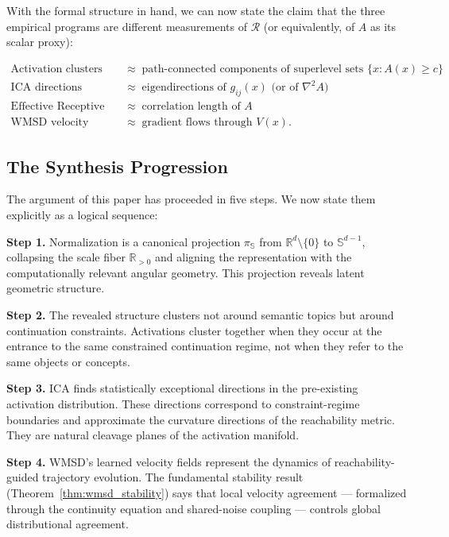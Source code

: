 \documentclass[12pt, a4paper]{article}
\theoremstyle{plain}
\theoremstyle{definition}
\theoremstyle{remark}
\newcommand{\R}{\mathbb{R}}
\newcommand{\Sph}{\mathbb{S}}
\newcommand{\fA}{A}
\begin{document}
With the formal structure in hand, we can now state the claim that the three
empirical programs are different measurements of $\mathcal{R}$ (or equivalently,
of $\fA$ as its scalar proxy):

\begin{equation}
\begin{aligned}
  \text{Activation clusters} &\;\approx\; \text{path-connected components of superlevel sets }
    \bigl\{x : \fA(x) \geq c\bigr\} \\
  \text{ICA directions} &\;\approx\; \text{eigendirections of } g_{ij}(x)
    \text{ (or of } \nabla^2 \fA\text{)} \\
  \text{Effective Receptive Field} &\;\approx\; \text{correlation length of } \fA \\
  \text{WMSD velocity fields} &\;\approx\; \text{gradient flows through } V(x).
\end{aligned}
\end{equation}

\subsection{The Synthesis Progression}

The argument of this paper has proceeded in five steps. We now state them
explicitly as a logical sequence:

\textbf{Step 1.} Normalization is a canonical projection $\pi_\Sph$ from
$\R^d \setminus \{0\}$ to $\Sph^{d-1}$, collapsing the scale fiber $\R_{>0}$
and aligning the representation with the computationally relevant angular
geometry. This projection reveals latent geometric structure.

\textbf{Step 2.} The revealed structure clusters not around semantic topics
but around continuation constraints. Activations cluster together when they
occur at the entrance to the same constrained continuation regime, not when
they refer to the same objects or concepts.

\textbf{Step 3.} ICA finds statistically exceptional directions in the
pre-existing activation distribution. These directions correspond to
constraint-regime boundaries and approximate the curvature directions of the
reachability metric. They are natural cleavage planes of the activation manifold.

\textbf{Step 4.} WMSD's learned velocity fields represent the dynamics of
reachability-guided trajectory evolution. The fundamental stability result
(Theorem~\ref{thm:wmsd_stability}) says that local velocity agreement ---
formalized through the continuity equation and shared-noise coupling ---
controls global distributional agreement.
\end{document}
